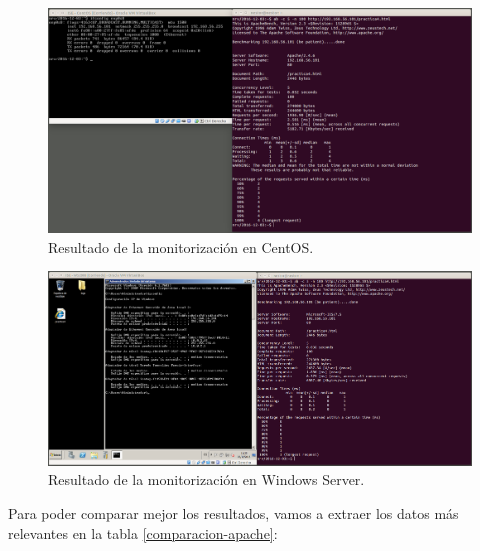\documentclass[a4paper,titlepage,12pt]{scrartcl}	%
\numberwithin{figure}{section} %
\numberwithin{table}{section} %
\begin{document}
	\begin{figure}[H]
		\includegraphics[width=\linewidth]{./Imagenes/3-CentOS.png}
		\vspace{-0.5cm}
		\caption[Resultado de la monitorización en CentOS.]{Resultado de la monitorización en CentOS.}
		\label{3-CentOS}
	\end{figure}
	
	\begin{figure}[H]
		\includegraphics[width=\linewidth]{./Imagenes/3-WindowsServer.png}
		\vspace{-0.5cm}
		\caption[Resultado de la monitorización en Windows Server.]{Resultado de la monitorización en Windows Server.}
		\label{3-WindowsServer}
	\end{figure}
	
	Para poder comparar mejor los resultados, vamos a extraer los datos más relevantes en la tabla \ref{comparacion-apache}:
	
\end{document}
